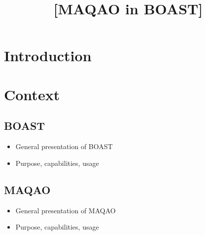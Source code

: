 \documentclass[11pt, a4paper, twoside]{montblanc2}
\begin{document}
\devnum{[5.11]}
\title{[MAQAO in BOAST]}
\version{[0.1]}
\deadline{[2017/01/16]}
\level{[PU]}
\nature{[O]}
\contributors{} %
\reviewers{} %

\maketitle

\begin{changelog}
\end{changelog}

\frontmatter

\begin{executive}
\end{executive}

\section{Introduction}

\section{Context}

\subsection{BOAST}
\begin{itemize}
  \item General presentation of BOAST
  \item Purpose, capabilities, usage
\end{itemize}



\subsection{MAQAO}
\begin{itemize}
  \item General presentation of MAQAO
  \item Purpose, capabilities, usage
\end{itemize}
\end{document}
